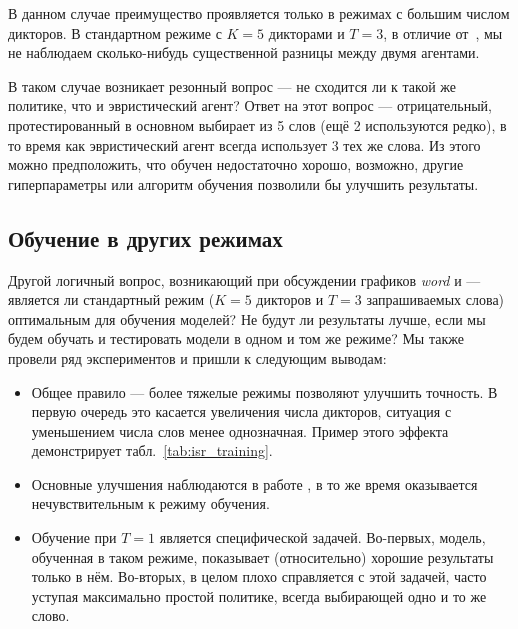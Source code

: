 В данном случае преимущество \enquirer{} проявляется только в режимах с большим
числом дикторов. В стандартном режиме с $K = 5$ дикторами и $T = 3$, в отличие
от~\citeisr{}, мы не наблюдаем сколько-нибудь существенной разницы между двумя
агентами.

В таком случае возникает резонный вопрос --- не сходится ли \enquirer{} к такой
же политике, что и эвристический агент? Ответ на этот вопрос --- отрицательный,
протестированный \enquirer{} в основном выбирает из 5 слов (ещё 2 используются
редко), в то время как эвристический агент всегда использует 3 тех же слова. Из
этого можно предположить, что \enquirer{} обучен недостаточно хорошо, возможно,
другие гиперпараметры или алгоритм обучения позволили бы улучшить результаты.

\subsection{Обучение в других режимах}

Другой логичный вопрос, возникающий при обсуждении графиков \textit{word} и
 --- является ли стандартный режим ($K = 5$ дикторов и
$T = 3$ запрашиваемых слова) оптимальным для обучения моделей? Не будут ли
результаты лучше, если мы будем обучать и тестировать модели в одном и том же
режиме? Мы также провели ряд экспериментов и пришли к следующим выводам:
\begin{itemize}
    \item Общее правило --- более тяжелые режимы позволяют улучшить точность.
    В первую очередь это касается увеличения числа дикторов, ситуация с
    уменьшением числа слов менее однозначная. Пример этого эффекта
    демонстрирует табл.~\ref{tab:isr_training}.
    \item Основные улучшения наблюдаются в работе \guesser{}, в то же время
    \enquirer{} оказывается нечувствительным к режиму обучения.
    \item Обучение при $T = 1$ является специфической задачей. Во-первых,
    модель, обученная в таком режиме, показывает (относительно) хорошие
    результаты только в нём. Во-вторых, \enquirer{} в целом плохо справляется
    с этой задачей, часто уступая максимально простой политике, всегда
    выбирающей одно и то же слово.
\end{itemize}

